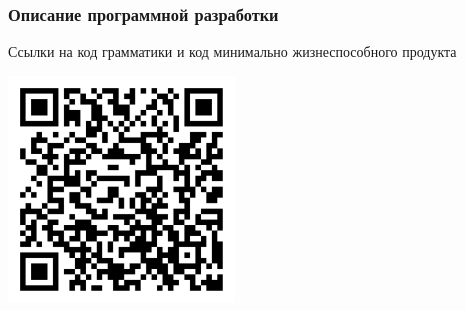 \documentclass[pdf, hyperref={unicode}, aspectratio=169]{beamer}
\begin{document}
\begin{frame}
\frametitle{Описание программной разработки}
	Ссылки на код грамматики и код минимально жизнеспособного продукта

	\begin{center}
		\includegraphics[height = 6cm]{img/qr-code-relatio-lang}
	\end{center}
\end{frame}
\end{document}
